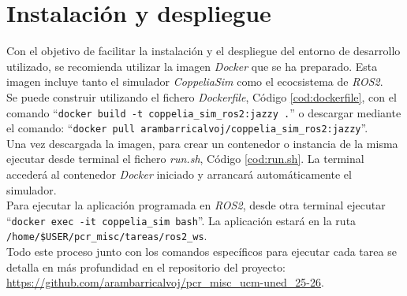 \section*{Instalación y despliegue}

Con el objetivo de facilitar la instalación y el despliegue del entorno 
de desarrollo utilizado, se recomienda utilizar la imagen \textit{Docker}
que se ha preparado. Esta imagen incluye tanto el simulador 
\textit{CoppeliaSim} como el ecocsistema de \textit{ROS2}. \\

Se puede construir utilizando el fichero \textit{Dockerfile}, 
Código \ref{cod:dockerfile}, con el comando ``\texttt{docker build -t coppelia\_sim\_ros2:jazzy .}''
o descargar mediante el comando: ``\texttt{docker pull arambarricalvoj/coppelia\_sim\_ros2:jazzy}''. \\

Una vez descargada la imagen, para crear un contenedor o instancia 
de la misma ejecutar desde terminal el fichero \textit{run.sh},
Código \ref{cod:run.sh}. La terminal accederá al contenedor \textit{Docker}
iniciado y arrancará automáticamente el simulador. \\

Para ejecutar la aplicación programada en \textit{ROS2}, desde 
otra terminal ejecutar ``\texttt{docker exec -it coppelia\_sim bash}''. 
La aplicación estará en la ruta 
\texttt{/home/\$USER/pcr\_misc/tareas/ros2\_ws}. \\

Todo este proceso junto con los comandos específicos para ejecutar
cada tarea se detalla en más profundidad en el repositorio del 
proyecto: \url{https://github.com/arambarricalvoj/pcr_misc_ucm-uned_25-26}.